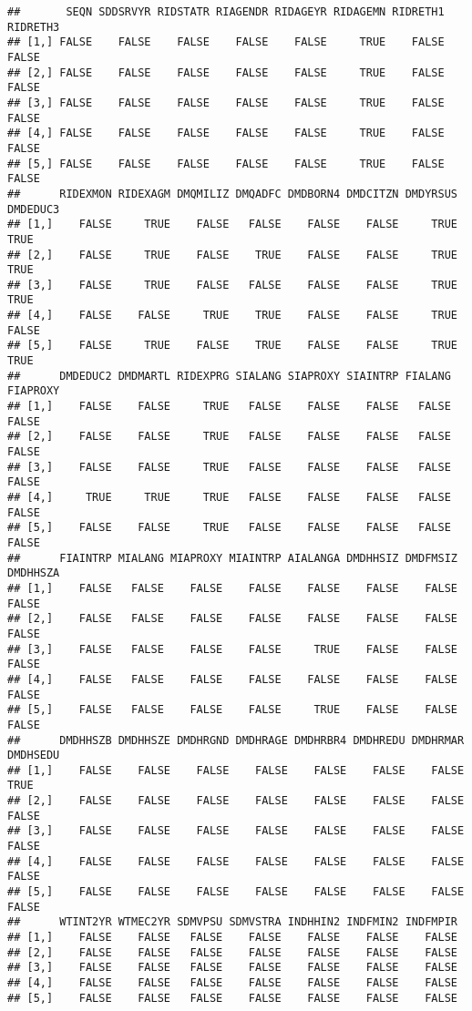 \documentclass[
]{book}
\begin{document}
\begin{verbatim}
##       SEQN SDDSRVYR RIDSTATR RIAGENDR RIDAGEYR RIDAGEMN RIDRETH1 RIDRETH3
## [1,] FALSE    FALSE    FALSE    FALSE    FALSE     TRUE    FALSE    FALSE
## [2,] FALSE    FALSE    FALSE    FALSE    FALSE     TRUE    FALSE    FALSE
## [3,] FALSE    FALSE    FALSE    FALSE    FALSE     TRUE    FALSE    FALSE
## [4,] FALSE    FALSE    FALSE    FALSE    FALSE     TRUE    FALSE    FALSE
## [5,] FALSE    FALSE    FALSE    FALSE    FALSE     TRUE    FALSE    FALSE
##      RIDEXMON RIDEXAGM DMQMILIZ DMQADFC DMDBORN4 DMDCITZN DMDYRSUS DMDEDUC3
## [1,]    FALSE     TRUE    FALSE   FALSE    FALSE    FALSE     TRUE     TRUE
## [2,]    FALSE     TRUE    FALSE    TRUE    FALSE    FALSE     TRUE     TRUE
## [3,]    FALSE     TRUE    FALSE   FALSE    FALSE    FALSE     TRUE     TRUE
## [4,]    FALSE    FALSE     TRUE    TRUE    FALSE    FALSE     TRUE    FALSE
## [5,]    FALSE     TRUE    FALSE    TRUE    FALSE    FALSE     TRUE     TRUE
##      DMDEDUC2 DMDMARTL RIDEXPRG SIALANG SIAPROXY SIAINTRP FIALANG FIAPROXY
## [1,]    FALSE    FALSE     TRUE   FALSE    FALSE    FALSE   FALSE    FALSE
## [2,]    FALSE    FALSE     TRUE   FALSE    FALSE    FALSE   FALSE    FALSE
## [3,]    FALSE    FALSE     TRUE   FALSE    FALSE    FALSE   FALSE    FALSE
## [4,]     TRUE     TRUE     TRUE   FALSE    FALSE    FALSE   FALSE    FALSE
## [5,]    FALSE    FALSE     TRUE   FALSE    FALSE    FALSE   FALSE    FALSE
##      FIAINTRP MIALANG MIAPROXY MIAINTRP AIALANGA DMDHHSIZ DMDFMSIZ DMDHHSZA
## [1,]    FALSE   FALSE    FALSE    FALSE    FALSE    FALSE    FALSE    FALSE
## [2,]    FALSE   FALSE    FALSE    FALSE    FALSE    FALSE    FALSE    FALSE
## [3,]    FALSE   FALSE    FALSE    FALSE     TRUE    FALSE    FALSE    FALSE
## [4,]    FALSE   FALSE    FALSE    FALSE    FALSE    FALSE    FALSE    FALSE
## [5,]    FALSE   FALSE    FALSE    FALSE     TRUE    FALSE    FALSE    FALSE
##      DMDHHSZB DMDHHSZE DMDHRGND DMDHRAGE DMDHRBR4 DMDHREDU DMDHRMAR DMDHSEDU
## [1,]    FALSE    FALSE    FALSE    FALSE    FALSE    FALSE    FALSE     TRUE
## [2,]    FALSE    FALSE    FALSE    FALSE    FALSE    FALSE    FALSE    FALSE
## [3,]    FALSE    FALSE    FALSE    FALSE    FALSE    FALSE    FALSE    FALSE
## [4,]    FALSE    FALSE    FALSE    FALSE    FALSE    FALSE    FALSE    FALSE
## [5,]    FALSE    FALSE    FALSE    FALSE    FALSE    FALSE    FALSE    FALSE
##      WTINT2YR WTMEC2YR SDMVPSU SDMVSTRA INDHHIN2 INDFMIN2 INDFMPIR
## [1,]    FALSE    FALSE   FALSE    FALSE    FALSE    FALSE    FALSE
## [2,]    FALSE    FALSE   FALSE    FALSE    FALSE    FALSE    FALSE
## [3,]    FALSE    FALSE   FALSE    FALSE    FALSE    FALSE    FALSE
## [4,]    FALSE    FALSE   FALSE    FALSE    FALSE    FALSE    FALSE
## [5,]    FALSE    FALSE   FALSE    FALSE    FALSE    FALSE    FALSE
\end{verbatim}
\end{document}
